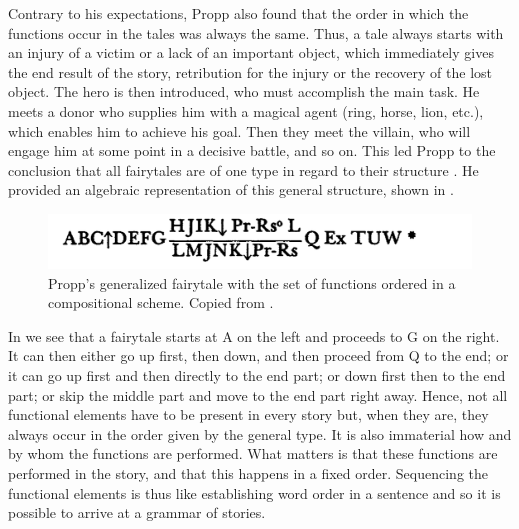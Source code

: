 \documentclass[output=paper]{langscibook}
\begin{document}
Contrary to his expectations, Propp also found that the order in which the functions occur in the tales was always the same. Thus, a tale always starts with an injury of a victim or a lack of an important object, which immediately gives the end result of the story, retribution for the injury or the recovery of the lost object. The hero is then introduced, who must accomplish the main task. He meets a donor who supplies him with a magical agent (ring, horse, lion, etc.), which enables him to achieve his goal. Then they meet the villain, who will engage him at some point in a decisive battle, and so on. This led Propp to the conclusion that all fairytales are of one type in regard to their structure \citep[23]{Propp1968}. He provided an algebraic representation of this general structure, shown in .

\begin{figure}
    \centering
    \includegraphics[scale=0.55]{figures/Propp.png}
    \caption{Propp's generalized fairytale with the set of functions ordered in a compositional scheme. Copied from \cite[105]{Propp1968}.}
    \label{fig:karstens:proppfairytale}
\end{figure}

In  we see that a fairytale starts at A on the left and proceeds to G on the right. It can then either go up first, then down, and then proceed from Q to the end; or it can go up first and then directly to the end part; or down first then to the end part; or skip the middle part and move to the end part right away. Hence, not all functional elements have to be present in every story but, when they are, they always occur in the order given by the general type. It is also immaterial how and by whom the functions are performed. What matters is that these functions are performed in the story, and that this happens in a fixed order. Sequencing the functional elements is thus like establishing word order in a sentence and so it is possible to arrive at a grammar of stories. 
\end{document}
